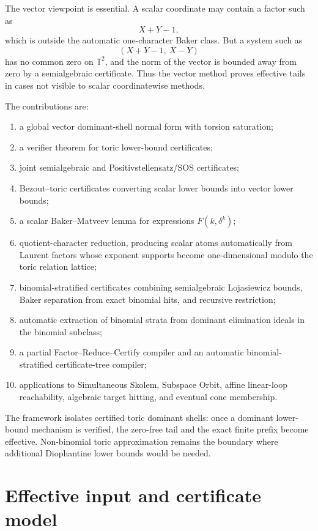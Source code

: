 \documentclass[11pt]{article}
\newcommand{\T}{\mathbb T}
\begin{document}
The vector viewpoint is essential. A scalar coordinate may contain a factor such as
\[
X+Y-1,
\]
which is outside the automatic one-character Baker class. But a system such as
\[
(X+Y-1,\ X-Y)
\]
has no common zero on \(\T^2\), and the norm of the vector is bounded away from zero by a semialgebraic certificate. Thus the vector method proves effective tails in cases not visible to scalar coordinatewise methods.

The contributions are:
\begin{enumerate}
\item a global vector dominant-shell normal form with torsion saturation;
\item a verifier theorem for toric lower-bound certificates;
\item joint semialgebraic and Positivstellensatz/SOS certificates;
\item Bezout--toric certificates converting scalar lower bounds into vector lower bounds;
\item a scalar Baker--Matveev lemma for expressions \(F(k,\delta^k)\);
\item quotient-character reduction, producing scalar atoms automatically from Laurent factors whose exponent supports become one-dimensional modulo the toric relation lattice;
\item binomial-stratified certificates combining semialgebraic Lojasiewicz bounds, Baker separation from exact binomial hits, and recursive restriction;
\item automatic extraction of binomial strata from dominant elimination ideals in the binomial subclass;
\item a partial Factor--Reduce--Certify compiler and an automatic binomial-stratified certificate-tree compiler;
\item applications to Simultaneous Skolem, Subspace Orbit, affine linear-loop reachability, algebraic target hitting, and eventual cone membership.
\end{enumerate}

The framework isolates certified toric dominant shells: once a dominant lower-bound mechanism is verified, the zero-free tail and the exact finite prefix become effective. Non-binomial toric approximation remains the boundary where additional Diophantine lower bounds would be needed.

\section{Effective input and certificate model}
\end{document}
